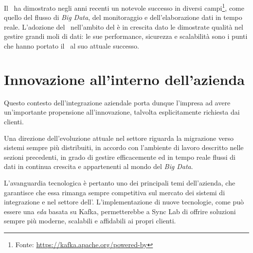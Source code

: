 Il \software\ ha dimostrato negli anni recenti un notevole successo in diversi campi\footnote{Fonte: \url{https://kafka.apache.org/powered-by}}, come quello del flusso di \textit{Big Data}, del monitoraggio e dell'elaborazione dati in tempo reale.
L'adozione del \software\ nell'ambito del  è in crescita dato le dimostrate qualità nel gestire grandi moli di dati: le sue performance, sicurezza e scalabilità sono i punti che hanno portato il \software\ al suo attuale successo.

\section{Innovazione all'interno dell'azienda}


Questo contesto dell'integrazione aziendale porta dunque l'impresa ad avere un'importante propensione all'innovazione, talvolta esplicitamente richiesta dai clienti.

Una direzione dell'evoluzione attuale nel settore  riguarda la migrazione verso sistemi sempre più distribuiti, in accordo con l'ambiente di lavoro descritto nelle sezioni precedenti, in grado di gestire efficacemente ed in tempo reale flussi di dati in continua crescita e appartenenti al mondo del \textit{Big Data}.

L'avanguardia tecnologica è pertanto uno dei principali temi dell'azienda, che garantisce che essa rimanga sempre competitiva sul mercato dei sistemi di integrazione e nel settore dell'.
L'implementazione di nuove tecnologie, come può essere una \textit{\acrlong{eda}} basata su Kafka, permetterebbe a Sync Lab di offrire soluzioni sempre più moderne, scalabili e affidabili ai propri clienti.
